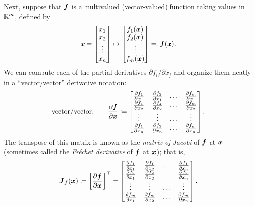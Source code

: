 Next, suppose that \(\boldsymbol{f}\) is a multivalued (vector-valued) function taking values in \(\mathbb{R}^m\), defined by
\begin{equation*}
	\boldsymbol{x} =
	\begin{bmatrix}
		x_1    \\
		x_2    \\
		\vdots \\
		x_n
	\end{bmatrix}
	\mapsto
	\begin{bmatrix}
		f_1(\boldsymbol{x}) \\
		f_2(\boldsymbol{x}) \\
		\vdots        \\
		f_m(\boldsymbol{x})
	\end{bmatrix}
	\eqqcolon \boldsymbol{f}(\boldsymbol{x}).
\end{equation*}
We can compute each of the partial derivatives \(\partial f_i / \partial x_j\) and organize them neatly in a ``vector/vector'' derivative notation:
\begin{equation}
	\text{vector/vector:} \qquad \frac{\partial \boldsymbol{f}}{\partial \boldsymbol{x}} \coloneqq
	\begin{bmatrix}
		\frac{\partial f_1}{\partial x_1} & \frac{\partial f_2}{\partial x_1} & \dots & \frac{\partial f_m}{\partial x_1} \\
		\frac{\partial f_1}{\partial x_2} & \frac{\partial f_2}{\partial x_2} & \dots & \frac{\partial f_m}{\partial x_2} \\
		\vdots                            & \vdots                            & \dots & \vdots                            \\
		\frac{\partial f_1}{\partial x_n} & \frac{\partial f_2}{\partial x_n} & \dots & \frac{\partial f_m}{\partial x_n}
	\end{bmatrix}. \label{eq:VectorVectorDerivative}
\end{equation}
The transpose of this matrix is known as the \textit{matrix of Jacobi} of \(\boldsymbol{f}\) at \(\boldsymbol{x}\) (sometimes called the \textit{Fr\'{e}chet derivative} of \(\boldsymbol{f}\) at \(\boldsymbol{x}\)); that is,
\begin{equation}
	\boldsymbol{J}_{\boldsymbol{f}}(\boldsymbol{x}) \coloneqq \left[ \frac{\partial \boldsymbol{f}}{\partial \boldsymbol{x}} \right]^\top =
	\begin{bmatrix}
		\frac{\partial f_1}{\partial x_1} & \frac{\partial f_1}{\partial x_2} & \dots & \frac{\partial f_1}{\partial x_n} \\
		\frac{\partial f_2}{\partial x_1} & \frac{\partial f_2}{\partial x_2} & \dots & \frac{\partial f_2}{\partial x_n} \\
		\vdots                            & \vdots                            & \dots & \vdots                            \\
		\frac{\partial f_m}{\partial x_1} & \frac{\partial f_m}{\partial x_2} & \dots & \frac{\partial f_m}{\partial x_n}
	\end{bmatrix}. \label{eq:JacobianMatrix}
\end{equation}
